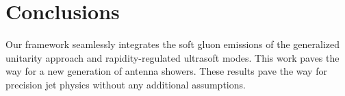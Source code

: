 \section{Conclusions}\label{sec:conclusions}

Our framework seamlessly integrates the soft gluon emissions of the
generalized unitarity approach and rapidity-regulated ultrasoft modes.
This work paves the way for a new generation of antenna showers. These
results pave the way for precision jet physics without any additional
assumptions.

